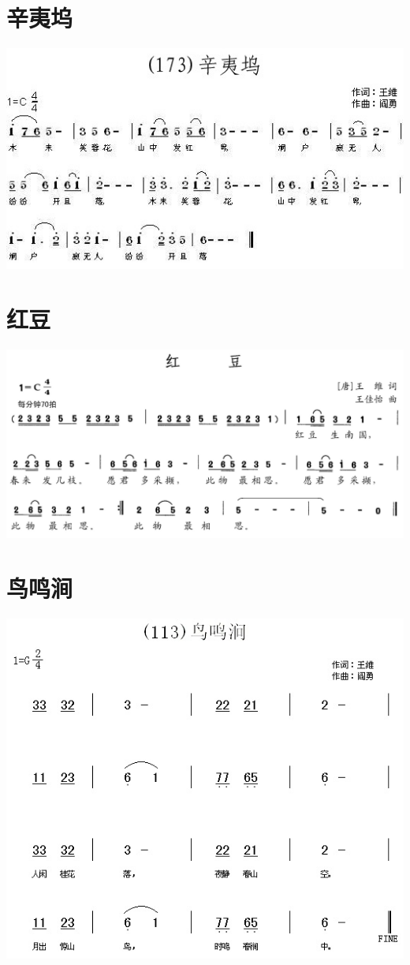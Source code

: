 \documentclass[cn,pad,twocol]{elegantbook}
\begin{document}
\section{辛夷坞}    \includegraphics[width=\textwidth]{dongxiao/20200627-王维-辛夷坞.jpg} 
\section{红豆}      \includegraphics[width=\textwidth]{dongxiao/20200628-王维-红豆} 
\section{鸟鸣涧}    \includegraphics[width=\textwidth]{dongxiao/20200627-王维-鸟鸣涧}
\end{document}
